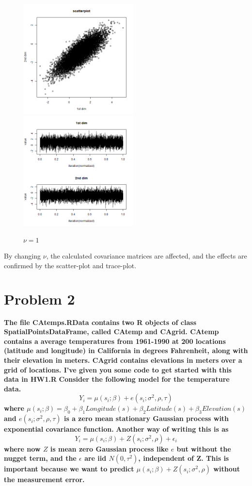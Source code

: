 \documentclass{article}
\begin{document}
\begin{figure}[!h]
    \caption{$\nu=0.5$}
    \centering
    \includegraphics[height=6cm]{prob1_test4_oneprocess_scatter.png}
    \includegraphics[height=6cm]{prob1_test4_oneprocess_traceplot.png}
    \caption{$\nu=1$}
\end{figure}

By changing $\nu$, the calculated covariance matrices are affected,
and the effects are confirmed by the scatter-plot and trace-plot.


\newpage
\section{Problem 2}
\textbf{
The file CAtemps.RData contains two R objects of class SpatialPointsDataFrame, called CAtemp and CAgrid.
CAtemp contains a average temperatures from 1961-1990 at 200 locations (latitude and longitude) in California in degrees Fahrenheit, along with their elevation in meters.
CAgrid contains elevations in meters over a grid of locations.
I've given you some code to get started with this data in HW1.R
}
\textbf{
Consider the following model for the temperature data.
\[Y_i = \mu(s_i;\beta) + e(s_i; \sigma^2, \rho, \tau)\]
where \(\mu(s_i;\beta)=\beta_0+\beta_1 Longitude(s) + \beta_2 Latitude(s)
+\beta_3 Elevation(s)\) and \(e(s_i;\sigma^2,\rho,\tau)\) is a zero mean stationary Gaussian process with
exponential covariance function.
}
\textbf{
Another way of writing this is as
\[Y_i = \mu(s_i;\beta) + Z(s_i; \sigma^2, \rho) + \epsilon_i\]
where now $Z$ is mean zero Gaussian process like $e$ but without the nugget term,
and the $\epsilon$ are iid $N(0,\tau^2)$, independent of Z.
This is important because we want to predict \(\mu(s_i;\beta)+Z(s_i;\sigma^2,\rho)\) without the measurement error.
}
\end{document}
